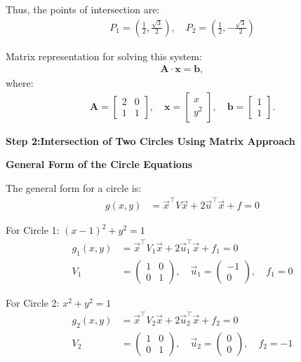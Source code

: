 \documentclass[journal]{IEEEtran}
\begin{document}
Thus, the points of intersection are:
\begin{align}
    P_1 = \left(\frac{1}{2}, \frac{\sqrt{3}}{2}\right), \quad P_2 = \left(\frac{1}{2}, -\frac{\sqrt{3}}{2}\right)
\end{align}

Matrix representation for solving this system:
\begin{align}
    \bm{A} \cdot \bm{x} = \bm{b},
\end{align}
where:
\begin{align}
    \bm{A} = \begin{bmatrix}
        2 & 0 \\
        1 & 1
    \end{bmatrix}, \quad
    \bm{x} = \begin{bmatrix}
        x \\ y^2
    \end{bmatrix}, \quad
    \bm{b} = \begin{bmatrix}
        1 \\ 1
    \end{bmatrix}.
\end{align}

\textbf{Step 2:Intersection of Two Circles Using Matrix Approach}

\textbf{ General Form of the Circle Equations}

The general form for a circle is:
\begin{align}
    g(x, y) &= \vec{x}^\top V \vec{x} + 2 \vec{u}^\top \vec{x} + f = 0
\end{align}

For Circle 1: \( (x - 1)^2 + y^2 = 1 \)
\begin{align}
    g_1(x, y) &= \vec{x}^\top V_1 \vec{x} + 2 \vec{u}_1^\top \vec{x} + f_1 = 0 \\
    V_1 &= \begin{pmatrix} 1 & 0 \\ 0 & 1 \end{pmatrix}, \quad
    \vec{u}_1 = \begin{pmatrix} -1 \\ 0 \end{pmatrix}, \quad
    f_1 = 0
\end{align}

For Circle 2: \( x^2 + y^2 = 1 \)
\begin{align}
    g_2(x, y) &= \vec{x}^\top V_2 \vec{x} + 2 \vec{u}_2^\top \vec{x} + f_2 = 0 \\
    V_2 &= \begin{pmatrix} 1 & 0 \\ 0 & 1 \end{pmatrix}, \quad
    \vec{u}_2 = \begin{pmatrix} 0 \\ 0 \end{pmatrix}, \quad
    f_2 = -1
\end{align}
\end{document}
